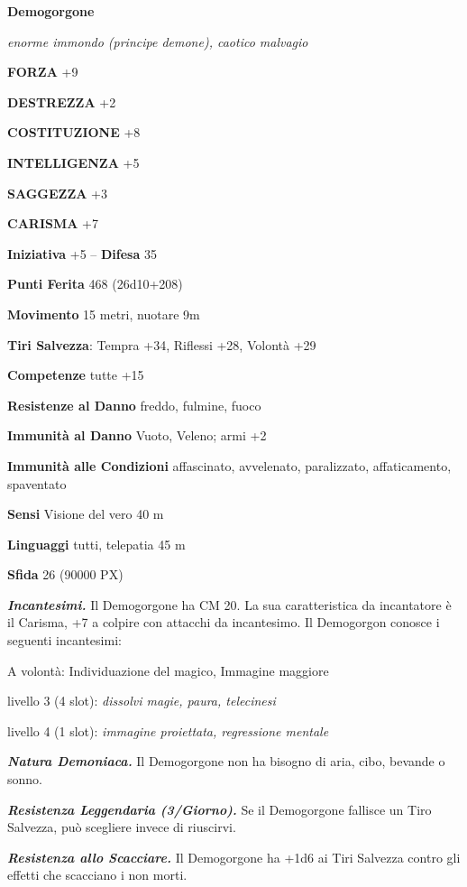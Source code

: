 \begin{multicols}{2}
	\medskip{}\textbf{Demogorgone}

	\textit{enorme immondo (principe demone), caotico malvagio}

	\textbf{FORZA} +9

	\textbf{DESTREZZA} +2

	\textbf{COSTITUZIONE} +8

	\textbf{INTELLIGENZA} +5

	\textbf{SAGGEZZA} +3

	\textbf{CARISMA} +7

	\textbf{Iniziativa} +5 -- \textbf{Difesa} 35

	\textbf{Punti Ferita} 468 (26d10+208)

	\textbf{Movimento} 15 metri, nuotare 9m

	\textbf{Tiri Salvezza}: Tempra +34, Riflessi +28, Volontà +29

	\textbf{Competenze} tutte +15

	\textbf{Resistenze al Danno} freddo, fulmine, fuoco

	\textbf{Immunità al Danno} Vuoto, Veleno; armi +2

	\textbf{Immunità alle Condizioni} affascinato, avvelenato, paralizzato, affaticamento, spaventato

	\textbf{Sensi} Visione del vero 40 m

	\textbf{Linguaggi} tutti, telepatia 45 m

	\textbf{Sfida} 26 (90000 PX)

	\textit{\textbf{Incantesimi.}} Il Demogorgone ha CM 20. La sua caratteristica da incantatore è il Carisma, +7 a colpire con attacchi da incantesimo. Il Demogorgon conosce i seguenti incantesimi:

	A volontà: Individuazione del magico, Immagine maggiore

	livello 3 (4 slot): \textit{dissolvi magie, paura, telecinesi}

	livello 4 (1 slot): \textit{immagine proiettata, regressione mentale}

	\textit{\textbf{Natura Demoniaca.}} Il Demogorgone non ha bisogno di aria, cibo, bevande o sonno.

	\textit{\textbf{Resistenza Leggendaria (3/Giorno).}} Se il Demogorgone fallisce un Tiro Salvezza, può scegliere invece di riuscirvi.

	\textit{\textbf{Resistenza allo Scacciare.}} Il Demogorgone ha +1d6 ai Tiri Salvezza contro gli effetti che scacciano i non morti.


\end{multicols}
